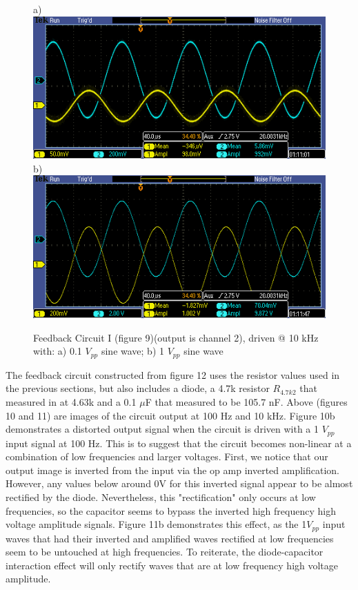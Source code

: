 \documentclass{article}
\begin{document}
    \begin{figure}[H]
        \centering
        a)\includegraphics[scale = 0.7]{7a.PNG}
        b)\includegraphics[scale = 0.7]{7b.PNG}
        \caption{Feedback Circuit I (figure 9)(output is channel 2), driven @ 10 kHz with: a) 0.1 $V_{pp}$ sine wave; b) 1 $V_{pp}$ sine wave}
        \label{fig:my_label}
    \end{figure}
    The feedback circuit constructed from figure 12 uses the resistor values used in the previous sections, but also includes a diode, a 4.7k resistor $R_{4.7k2}$ that measured in at 4.63k and a 0.1 $\mu$F that measured to be 105.7 nF. Above (figures 10 and 11) are images of the circuit output at 100 Hz and 10 kHz. Figure 10b demonstrates a distorted output signal when the circuit is driven with a 1 $V_{pp}$ input signal at 100 Hz. This is to suggest that the circuit becomes non-linear at a combination of low frequencies and larger voltages. First, we notice that our output image is inverted from the input via the op amp inverted amplification. However, any values below around 0V for this inverted signal appear to be almost rectified by the diode. Nevertheless, this "rectification" only occurs at low frequencies, so the capacitor seems to bypass the inverted high frequency high voltage amplitude signals. Figure 11b demonstrates this effect, as the 1$V_{pp}$ input waves that had their inverted and amplified waves rectified at low frequencies seem to be untouched at high frequencies. To reiterate, the diode-capacitor interaction effect will only rectify waves that are at low frequency high voltage amplitude.
    
\end{document}
